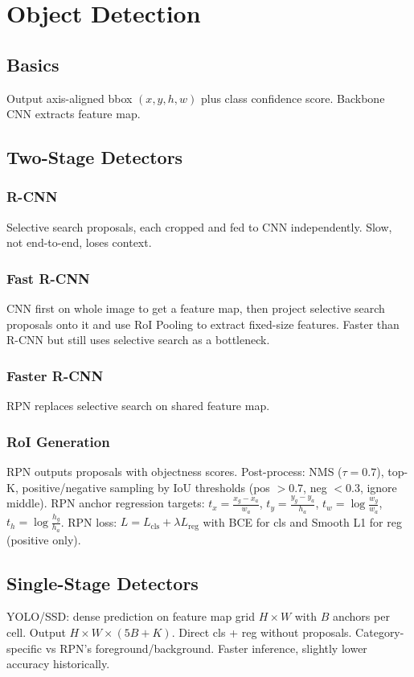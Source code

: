 \section{Object Detection}
\subsection{Basics}
Output axis-aligned bbox $(x,y,h,w)$ plus class confidence score. Backbone CNN extracts feature map.

\subsection{Two-Stage Detectors}
\subsubsection*{R-CNN}
Selective search proposals, each cropped and fed to CNN independently. Slow, not end-to-end, loses context.

\subsubsection*{Fast R-CNN}
CNN first on whole image to get a feature map, then project selective search proposals onto it and use RoI Pooling to extract fixed-size features. Faster than R-CNN but still uses selective search as a bottleneck.

\subsubsection*{Faster R-CNN}
RPN replaces selective search on shared feature map.

\subsubsection*{RoI Generation}
RPN outputs proposals with objectness scores. Post-process: NMS ($\tau=0.7$), top-K, positive/negative sampling by IoU thresholds (pos $>0.7$, neg $<0.3$, ignore middle).
RPN anchor regression targets: $t_x=\frac{x_g-x_a}{w_a}$, $t_y=\frac{y_g-y_a}{h_a}$, $t_w=\log\frac{w_g}{w_a}$, $t_h=\log\frac{h_g}{h_a}$.
RPN loss: $L=L_{\text{cls}}+\lambda L_{\text{reg}}$ with BCE for cls and Smooth L1 for reg (positive only).

\subsection{Single-Stage Detectors}
YOLO/SSD: dense prediction on feature map grid $H\times W$ with $B$ anchors per cell. Output $H\times W\times(5B+K)$.
Direct cls + reg without proposals.
Category-specific vs RPN's foreground/background.
Faster inference, slightly lower accuracy historically.


